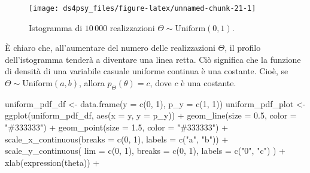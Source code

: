 \documentclass[
  11pt,
]{krantz}
\makeatletter
\newenvironment{Shaded}{\begin{snugshade}}{\end{snugshade}}
\newcommand{\AttributeTok}[1]{\textcolor[rgb]{0.61,0.61,0.61}{#1}}
\newcommand{\DecValTok}[1]{\textcolor[rgb]{0.06,0.06,0.06}{#1}}
\newcommand{\FloatTok}[1]{\textcolor[rgb]{0.06,0.06,0.06}{#1}}
\newcommand{\FunctionTok}[1]{\textcolor[rgb]{0,0,0}{#1}}
\newcommand{\NormalTok}[1]{#1}
\newcommand{\OtherTok}[1]{\textcolor[rgb]{0.37,0.37,0.37}{#1}}
\newcommand{\SpecialCharTok}[1]{\textcolor[rgb]{0,0,0}{#1}}
\newcommand{\StringTok}[1]{\textcolor[rgb]{0.5,0.5,0.5}{#1}}
\newenvironment{kframe}{%
\medskip{}
\setlength{\fboxsep}{.8em}
 \def\at@end@of@kframe{}%
 \ifinner\ifhmode%
  \def\at@end@of@kframe{\end{minipage}}%
  \begin{minipage}{\columnwidth}%
 \fi\fi%
 \def\FrameCommand##1{\hskip\@totalleftmargin \hskip-\fboxsep
 \colorbox{shadecolor}{##1}\hskip-\fboxsep
     \hskip-\linewidth \hskip-\@totalleftmargin \hskip\columnwidth}%
 \MakeFramed {\advance\hsize-\width
   \@totalleftmargin\z@ \linewidth\hsize
   \@setminipage}}%
 {\par\unskip\endMakeFramed%
 \at@end@of@kframe}
\renewenvironment{Shaded}{\begin{kframe}}{\end{kframe}}
\theoremstyle{definition}
\theoremstyle{definition}
\theoremstyle{definition}
\theoremstyle{definition}
\theoremstyle{remark}
\makeatother
\begin{document}
\begin{figure}[h]

{\centering \texttt{[image: ds4psy\_files/figure-latex/unnamed-chunk-21-1]} 

}

\caption{Istogramma di $10\,000$ realizzazioni $\Theta \sim \mbox{Uniform}(0, 1)$. }\label{fig:unnamed-chunk-21}
\end{figure}

È chiaro che, all'aumentare del numero delle realizzazioni \(\Theta\), il profilo dell'istogramma tenderà a diventare una linea retta. Ciò significa che la funzione di densità di una variabile casuale uniforme continua è una costante. Cioè, se \(\Theta \sim \mbox{Uniform} (a, b)\), allora \(p_{\Theta}(\theta) = c\), dove \(c\) è una costante.

\begin{Shaded}
\begin{Highlighting}[]
\NormalTok{uniform\_pdf\_df }\OtherTok{\textless{}{-}} \FunctionTok{data.frame}\NormalTok{(}\AttributeTok{y =} \FunctionTok{c}\NormalTok{(}\DecValTok{0}\NormalTok{, }\DecValTok{1}\NormalTok{), }\AttributeTok{p\_y =} \FunctionTok{c}\NormalTok{(}\DecValTok{1}\NormalTok{, }\DecValTok{1}\NormalTok{))}
\NormalTok{uniform\_pdf\_plot }\OtherTok{\textless{}{-}}
  \FunctionTok{ggplot}\NormalTok{(uniform\_pdf\_df, }\FunctionTok{aes}\NormalTok{(}\AttributeTok{x =}\NormalTok{ y, }\AttributeTok{y =}\NormalTok{ p\_y)) }\SpecialCharTok{+}
  \FunctionTok{geom\_line}\NormalTok{(}\AttributeTok{size =} \FloatTok{0.5}\NormalTok{, }\AttributeTok{color =} \StringTok{"\#333333"}\NormalTok{) }\SpecialCharTok{+}
  \FunctionTok{geom\_point}\NormalTok{(}\AttributeTok{size =} \FloatTok{1.5}\NormalTok{, }\AttributeTok{color =} \StringTok{"\#333333"}\NormalTok{) }\SpecialCharTok{+}
  \FunctionTok{scale\_x\_continuous}\NormalTok{(}\AttributeTok{breaks =} \FunctionTok{c}\NormalTok{(}\DecValTok{0}\NormalTok{, }\DecValTok{1}\NormalTok{), }\AttributeTok{labels =} \FunctionTok{c}\NormalTok{(}\StringTok{"a"}\NormalTok{, }\StringTok{"b"}\NormalTok{)) }\SpecialCharTok{+}
  \FunctionTok{scale\_y\_continuous}\NormalTok{(}
    \AttributeTok{lim =} \FunctionTok{c}\NormalTok{(}\DecValTok{0}\NormalTok{, }\DecValTok{1}\NormalTok{), }\AttributeTok{breaks =} \FunctionTok{c}\NormalTok{(}\DecValTok{0}\NormalTok{, }\DecValTok{1}\NormalTok{),}
    \AttributeTok{labels =} \FunctionTok{c}\NormalTok{(}\StringTok{"0"}\NormalTok{, }\StringTok{"c"}\NormalTok{)}
\NormalTok{  ) }\SpecialCharTok{+}
  \FunctionTok{xlab}\NormalTok{(}\FunctionTok{expression}\NormalTok{(theta)) }\SpecialCharTok{+}

\end{Highlighting}
\end{Shaded}
\end{document}
